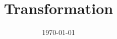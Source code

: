 \documentclass[11pt]{report}
\title{\textbf{Transformation}} %
\author{\scribe} %
\date{\today} %
\begin{document}
\maketitle	
\tableofcontents
\chapter{}

\chapter{}

\chapter{}

\chapter{}

\end{document}
